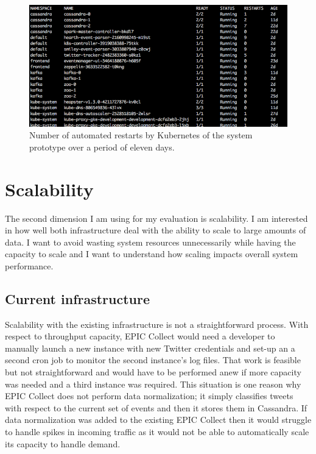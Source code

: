 \begin{figure}
\centering
\includegraphics[width=\textwidth]{Figures/pods}
\decoRule
\caption[Kubernets restarts in eleven days]{Number of automated restarts by Kubernetes of the system prototype over a period of eleven days.}
\label{fig:pods}
\end{figure}

\section{Scalability}

The second dimension I am using for my evaluation is scalability. I am interested in how well both infrastructure deal with the ability to scale to large amounts of data. I want to avoid wasting system resources unnecessarily while having the capacity to scale and I want to understand how scaling impacts overall system performance.

\subsection{Current infrastructure}

Scalability with the existing infrastructure is not a straightforward process. With respect to throughput capacity, EPIC Collect would need a developer to manually launch a new instance with new Twitter credentials and set-up an a second cron job to monitor the second instance’s log files. That work is feasible but not straightforward and would have to be performed anew if more capacity was needed and a third instance was required. This situation is one reason why EPIC Collect does not perform data normalization; it simply classifies tweets with respect to the current set of events and then it stores them in Cassandra. If data normalization was added to the existing EPIC Collect then it would struggle to handle spikes in incoming traffic as it would not be able to automatically scale its capacity to handle demand.

